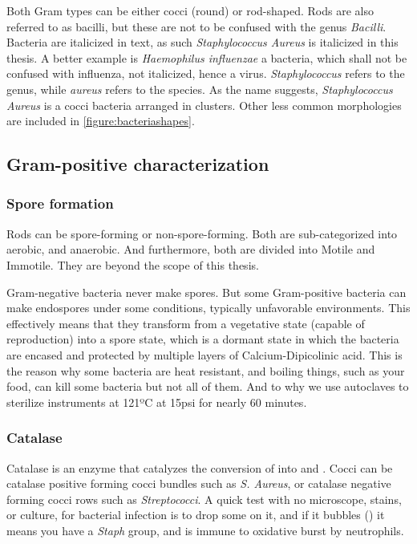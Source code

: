 Both Gram types can be either cocci (round) or rod-shaped. Rods are also referred to as bacilli, but these are not to be confused with the genus \textit{Bacilli}. Bacteria are italicized in text, as such \textit{Staphylococcus Aureus} is italicized in this thesis. A better example is \textit{Haemophilus influenzae} a bacteria, which shall not be confused with influenza, not italicized, hence a virus. \textit{Staphylococcus} refers to the genus, while \textit{aureus} refers to the species. As the name suggests, \textit{Staphylococcus Aureus} is a cocci bacteria arranged in clusters. Other less common morphologies are included in \ref{figure:bacteriashapes}. 

\subsection{Gram-positive characterization}

\subsubsection{Spore formation}

Rods can be spore-forming or non-spore-forming. Both are sub-categorized into aerobic, and anaerobic. And furthermore, both are divided into Motile and Immotile. They are beyond the scope of this thesis.

Gram-negative bacteria never make spores. But some Gram-positive bacteria can make endospores under some conditions, typically unfavorable environments. This effectively means that they transform from a vegetative state (capable of reproduction) into a spore state, which is a dormant state in which the bacteria are encased and protected by multiple layers of Calcium-Dipicolinic acid. This is the reason why some bacteria are heat resistant, and boiling things, such as your food, can kill some bacteria but not all of them. And to why we use autoclaves to sterilize instruments at 121ºC at 15psi for nearly 60 minutes.

\subsubsection{Catalase}

Catalase is an enzyme that catalyzes the conversion of  into  and . Cocci can be catalase positive forming cocci bundles such as \textit{S. Aureus}, or catalase negative forming cocci rows such as \textit{Streptococci}. A quick test with no microscope, stains, or culture, for bacterial infection is to drop some  on it, and if it bubbles () it means you have a \textit{Staph} group, and is immune to oxidative burst by neutrophils.

